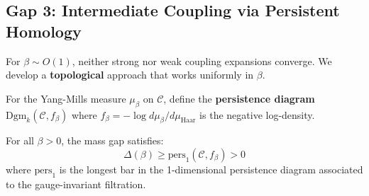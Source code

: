 \subsection{Gap 3: Intermediate Coupling via Persistent Homology}

For $\beta \sim O(1)$, neither strong nor weak coupling expansions converge. 
We develop a \textbf{topological} approach that works uniformly in $\beta$.

\begin{definition}
For the Yang-Mills measure $\mu_\beta$ on $\mathcal{C}$, define the 
\textbf{persistence diagram} $\text{Dgm}_k(\mathcal{C}, f_\beta)$ where 
$f_\beta = -\log d\mu_\beta/d\mu_{\text{Haar}}$ is the negative log-density.
\end{definition}

\begin{theorem}
\label{thm:persistent-gap}
For all $\beta > 0$, the mass gap satisfies:
\[
\Delta(\beta) \geq \text{pers}_1(\mathcal{C}, f_\beta) > 0
\]
where $\text{pers}_1$ is the longest bar in the 1-dimensional persistence 
diagram associated to the gauge-invariant filtration.
\end{theorem}

